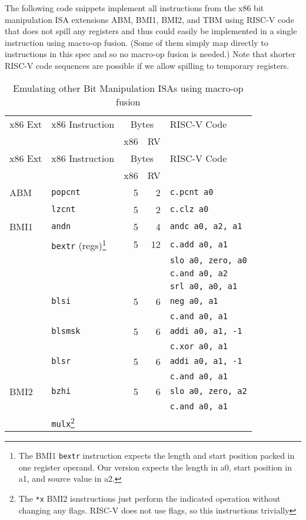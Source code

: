 The following code snippets implement all instructions from the x86 bit manipulation
ISA extensions ABM, BMI1, BMI2, and TBM using RISC-V code that does not spill any
registers and thus could easily be implemented in a single instruction using macro-op
fusion. (Some of them simply map directly to instructions in this spec and so no
macro-op fusion is needed.) Note that shorter RISC-V code sequences are possible if
we allow spilling to temporary registers.

\begin{longtable}[c]{@{}llrrl@{}}
\caption{Emulating other Bit Manipulation ISAs using macro-op fusion}\tabularnewline
\toprule
x86 Ext & x86 Instruction & \multicolumn{2}{c}{Bytes} & RISC-V Code\tabularnewline
        &                 & x86 & RV            &\tabularnewline
\midrule
\endfirsthead
\toprule
x86 Ext & x86 Instruction & \multicolumn{2}{c}{Bytes} & RISC-V Code\tabularnewline
        &                 & x86 & RV            &\tabularnewline
\midrule
\endhead
ABM  & {\tt popcnt}           & 5 &  2 & {\tt c.pcnt a0}\tabularnewline
\cline{2-5}
     & {\tt lzcnt}            & 5 &  2 & {\tt c.clz a0}\tabularnewline
\midrule
BMI1 & {\tt andn}             & 5 &  4 & {\tt andc a0, a2, a1}\tabularnewline
\cline{2-5}
     & {\tt bextr} (regs)\footnote{
         The BMI1 {\tt bextr} instruction expects the length and start position packed in one
	 register operand. Our version expects the length in a0, start position in a1, and source
	 value in a2.
                            } & 5 & 12 & {\tt c.add a0, a1}\tabularnewline
     &                        &   &    & {\tt slo a0, zero, a0}\tabularnewline
     &                        &   &    & {\tt c.and a0, a2}\tabularnewline
     &                        &   &    & {\tt srl a0, a0, a1}\tabularnewline
\cline{2-5}
     & {\tt blsi}             & 5 &  6 & {\tt neg a0, a1}\tabularnewline
     &                        &   &    & {\tt c.and a0, a1}\tabularnewline
\cline{2-5}
     & {\tt blsmsk}           & 5 &  6 & {\tt addi a0, a1, -1}\tabularnewline
     &                        &   &    & {\tt c.xor a0, a1}\tabularnewline
\cline{2-5}
     & {\tt blsr}             & 5 &  6 & {\tt addi a0, a1, -1}\tabularnewline
     &                        &   &    & {\tt c.and a0, a1}\tabularnewline
\midrule
BMI2 & {\tt bzhi}             & 5 &  6 & {\tt slo a0, zero, a2}\tabularnewline
     &                        &   &    & {\tt c.and a0, a1}\tabularnewline
\cline{2-5}
     & {\tt mulx}\footnote{
         The \texttt{*x} BMI2 isnstructions just perform the indicated operation without
	 changing any flags. RISC-V does not use flags, so this instructions trivially
}
\end{longtable}

